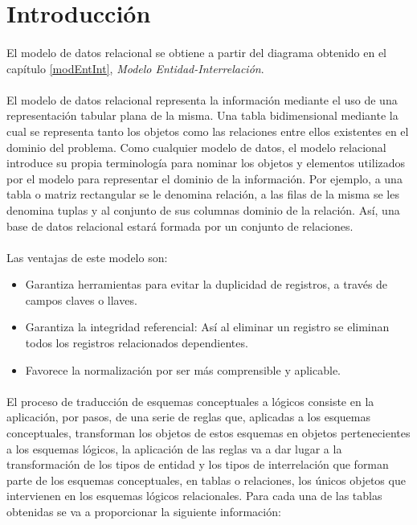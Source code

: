 \section{Introducción}

   \paragraph{}El modelo de datos relacional se obtiene a partir del diagrama
   obtenido en el capítulo \ref{modEntInt}, \textit{Modelo
   Entidad-Interrelación}.

   \paragraph{}El modelo de datos relacional representa la información mediante
   el uso de una representación tabular plana de la misma. Una tabla
   bidimensional mediante la cual se representa tanto los objetos como las
   relaciones entre ellos existentes en el dominio del problema. Como cualquier
   modelo de datos, el modelo relacional introduce su propia terminología para
   nominar los objetos y elementos utilizados por el modelo para representar el
   dominio de la información. Por ejemplo, a una tabla o matriz rectangular se
   le denomina relación, a las filas de la misma se les denomina tuplas y al
   conjunto de sus columnas dominio de la relación. Así, una base de datos
   relacional estará formada por un conjunto de relaciones.

   \paragraph{}Las ventajas de este modelo son:

   \begin{itemize}
    \item Garantiza herramientas para evitar la duplicidad de registros, a
    través de campos claves o llaves.
    \item Garantiza la integridad referencial: Así al eliminar un registro
    se eliminan todos los registros relacionados dependientes.
    \item Favorece la normalización por ser más comprensible y aplicable.
   \end{itemize}

   \paragraph{}El proceso de traducción de esquemas conceptuales a lógicos
   consiste en la aplicación, por pasos, de una serie de reglas que, aplicadas a
   los esquemas conceptuales, transforman los objetos de estos esquemas en
   objetos pertenecientes a los esquemas lógicos, la aplicación de las reglas va
   a dar lugar a la transformación de los tipos de entidad y los tipos de
   interrelación que forman parte de los esquemas conceptuales, en tablas o
   relaciones, los únicos objetos que intervienen en los esquemas lógicos
   relacionales. Para cada una de las tablas obtenidas se va a proporcionar la
   siguiente información:

